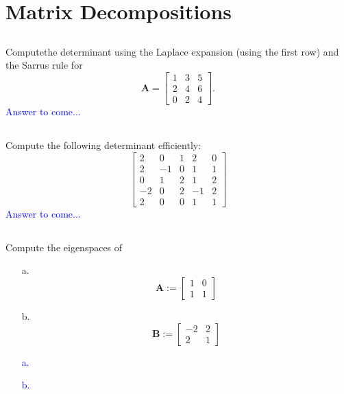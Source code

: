 \documentclass[a4paper,12pt]{article}
\newcommand{\M}[1]{ \begin{bmatrix} #1 \end{bmatrix} }
\newcommand{\matA}{\textbf{A}}
\newcommand{\matB}{\textbf{B}}
\begin{document}
\section{Matrix Decompositions}
\subsection{}
Computethe determinant using the Laplace expansion (using the first row) and the Sarrus rule for 
$$\matA = \M{1&3&5\\2&4&6\\0&2&4}.$$
\textcolor{blue}{
Answer to come...
}
\subsection{}
Compute the following determinant efficiently:
$$\M{2 &0&1&2&0\\
         2 &-1&0&1&1\\
         0 &1&2&1&2\\
         -2&0&2&-1&2\\
         2 &0&0&1&1}$$
\textcolor{blue}{
Answer to come...
}
\subsection{}
Compute the eigenspaces of 
\begin{itemize}
 \item [a.] $$\matA := \M{1&0\\1&1}$$
 \item [b.] $$\matB := \M{-2&2\\2&1}$$
\end{itemize}
\textcolor{blue}{
\begin{itemize}
 \item [a.] 
 \item [b.] 
\end{itemize}
}
\end{document}
